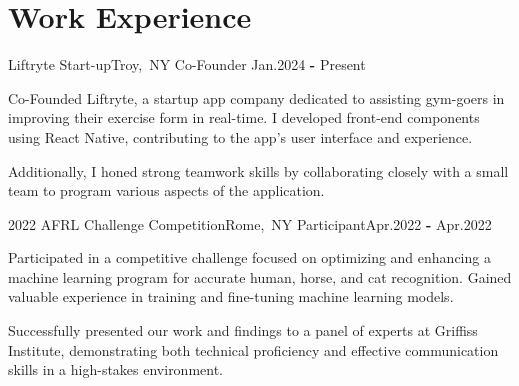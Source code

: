 \section*{Work Experience}
\resumeSubHeadingListStart

\resumeSubheading
{Liftryte Start-up}{Troy,\, NY}
{Co-Founder}
{Jan.\@ 2024 \textbf{-} Present} 
\resumeItemListStart
\item Co-Founded Liftryte, a startup app company dedicated to assisting gym-goers in improving their exercise form in real-time. I developed front-end components using React Native, contributing to the app’s user interface and experience. 
\item Additionally, I honed strong teamwork skills by collaborating closely with a small team to program various aspects of the application.
\resumeItemListEnd

\resumeSubheading
{2022 AFRL Challenge Competition}{Rome,\, NY}
{Participant}{Apr.\@ 2022 \textbf{-} Apr.\@ 2022} 
\resumeItemListStart
\item Participated in a competitive challenge focused on optimizing and enhancing a machine learning program for accurate human, horse, and cat recognition. Gained valuable experience in training and fine-tuning machine learning models.
\item Successfully presented our work and findings to a panel of experts at Griffiss Institute, demonstrating both technical proficiency and effective communication skills in a high-stakes environment.
\resumeItemListEnd

\resumeSubHeadingListEnd